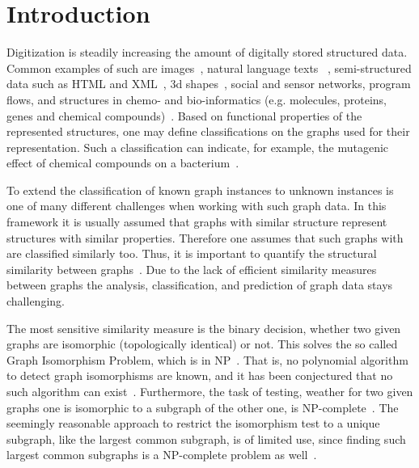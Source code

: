 \section{Introduction} \label{sec:introduction}
	Digitization is steadily increasing the amount of digitally stored structured data.
	Common examples of such are images~\cite{2003_Barla_CONF, 2005_Boughorbel_IEEE, 2007_Grauman_CONF, 2007_Harchaoui_IEEE}, natural language texts ~\cite{1999_Manning_CONF}, semi-structured data such as HTML and XML~\cite{2000_Abiteboul_CONF}, 3d shapes~\cite{2015_Bai_CONF}, social and sensor networks, program flows, and structures in chemo- and bio-informatics (e.g. molecules, proteins, genes and chemical compounds)~\cite{2005_Borgwardt_CONF, 2005_Froehlich_ICML, 2011_Shervashidze_JMLR}.
	Based on functional properties of the represented structures, one may define classifications on the graphs used for their representation.
	Such a classification can indicate, for example, the mutagenic effect of chemical compounds on a bacterium~\cite{1991_Debnath_CONF}. 
	
	To extend the classification of known graph instances to unknown instances is one of many different challenges when working with such graph data.
	In this framework it is usually assumed that graphs with similar structure represent structures with similar properties.
	Therefore one assumes that such graphs with are classified similarly too.
	Thus, it is important to quantify the structural similarity between graphs~\cite{2011_Shervashidze_JMLR}. 
	Due to the lack of efficient similarity measures between graphs the analysis, classification, and prediction of graph data stays challenging.	
	
	The most sensitive similarity measure is the binary decision, whether two given graphs are isomorphic (topologically identical) or not.
	This solves the so called Graph Isomorphism Problem, which is in NP~\cite{1979_Garey_BOOK}. %
	That is, no polynomial algorithm to detect graph isomorphisms are known, and it has been conjectured that no such algorithm can exist~\cite{1977_Read_CONF}.
	Furthermore, the task of testing, weather for two given graphs one is isomorphic to a subgraph of the other one, is NP-complete~\cite{1979_Garey_BOOK}. 
	The seemingly reasonable approach to restrict the isomorphism test to a unique subgraph, like the largest common subgraph, is of limited use, since finding such largest common subgraphs is a NP-complete problem as well~\cite{1979_Garey_BOOK}.
	
